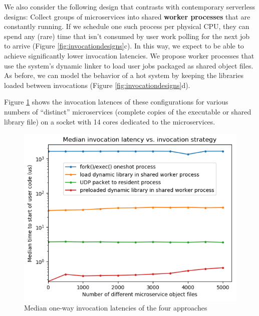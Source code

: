 We also consider the following design that contrasts with contemporary serverless designs:
Collect groups of microservices into shared \textbf{worker processes} that are constantly running.
If we schedule one such process per physical CPU, they can spend any (rare) time that isn't consumed by user work polling for the next job to arrive (Figure \ref{fig:invocationdesigns}c).
In this way, we expect to be able to achieve significantly lower invocation latencies.
We propose worker processes that use the system's dynamic linker to load user jobs packaged as shared object files.
As before, we can model the behavior of a hot system by keeping the libraries loaded between invocations (Figure \ref{fig:invocationdesigns}d).

Figure \ref{fig:motive} shows the invocation latences of these configurations for various numbers of ``distinct'' microservices (complete copies of the executable or shared library file) on a socket with 14 cores dedicated to the microservices.


\begin{figure}
\includegraphics[width=\columnwidth]{figs/2018-02-02-motivation_numfuns-latency-reordered}
\caption{Median one-way invocation latencies of the four approaches}
\label{fig:motive}
\end{figure}

